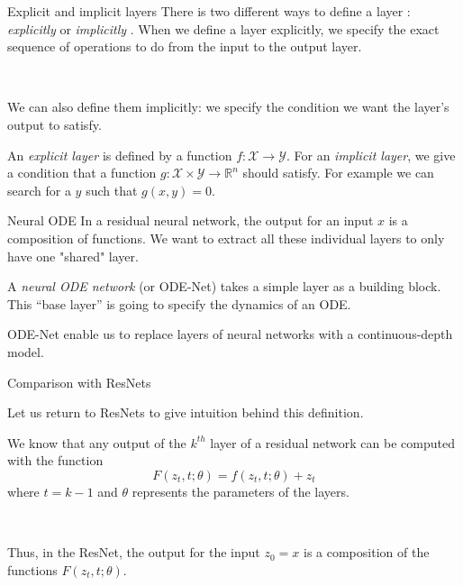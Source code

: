 \documentclass[11pt]{beamer}
\begin{document}
\begin{frame}{Explicit and implicit layers}
There is two different ways to define a layer : \textit{explicitly} or \textit{implicitly} \cite{2}. When we define a layer explicitly, we specify the exact sequence of operations to do from the input to the output layer. 

~

We can also define them implicitly: we specify the condition we want the layer's output to satisfy. 

\begin{definition}
An \textit{explicit layer} is defined by a function $f : \mathcal{X} \rightarrow \mathcal{Y}$. For an \textit{implicit layer}, we give a condition that a function $g: \mathcal{X} \times \mathcal{Y} \rightarrow \mathbb{R}^n$ should satisfy. For example we can search for a $y$ such that $g(x,y) = 0$.
\end{definition}
\end{frame}

\begin{frame}{Neural ODE}
In a residual neural network, the output for an input $x$ is a composition of functions. We want to extract all these individual layers to only have one "shared" layer.

\begin{definition}
A \textit{neural ODE network} (or ODE-Net) \cite{2,3,12} takes a simple layer as a building block. This “base layer” is going to specify the dynamics of an ODE.

\end{definition}
ODE-Net enable us to replace layers of neural networks with a continuous-depth model.
\end{frame}
\begin{frame}{Comparison with ResNets}

Let us return to ResNets to give intuition behind this definition. 

We know that any output of the $k^{th}$ layer of a residual network can be computed with the function
\begin{equation*}
F(z_t, t; \theta) = f(z_t, t;\theta) + z_t
\end{equation*}
where $t = k - 1$ and $\theta$ represents the parameters of the layers.

~

Thus, in the ResNet, the output for the input $z_0 = x$ is a composition of the functions $F(z_t, t; \theta)$.
\end{frame}
\end{document}
